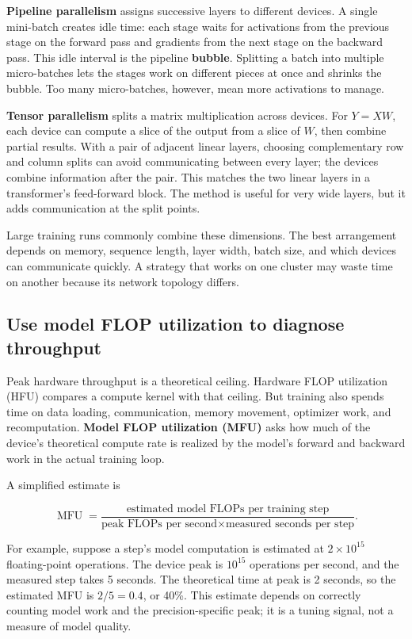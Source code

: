 \textbf{Pipeline parallelism} assigns successive layers to different devices. A single mini-batch creates idle time: each stage waits for activations from the previous stage on the forward pass and gradients from the next stage on the backward pass. This idle interval is the pipeline \textbf{bubble}. Splitting a batch into multiple micro-batches lets the stages work on different pieces at once and shrinks the bubble. Too many micro-batches, however, mean more activations to manage.

\textbf{Tensor parallelism} splits a matrix multiplication across devices. For \(Y=XW\), each device can compute a slice of the output from a slice of \(W\), then combine partial results. With a pair of adjacent linear layers, choosing complementary row and column splits can avoid communicating between every layer; the devices combine information after the pair. This matches the two linear layers in a transformer's feed-forward block. The method is useful for very wide layers, but it adds communication at the split points.

Large training runs commonly combine these dimensions. The best arrangement depends on memory, sequence length, layer width, batch size, and which devices can communicate quickly. A strategy that works on one cluster may waste time on another because its network topology differs.

\subsection{Use model FLOP utilization to diagnose throughput}\label{04-visual-computing-ii-ch031-use-model-flop-utilization-to-diagnose-throughput}

Peak hardware throughput is a theoretical ceiling. Hardware FLOP utilization (HFU) compares a compute kernel with that ceiling. But training also spends time on data loading, communication, memory movement, optimizer work, and recomputation. \textbf{Model FLOP utilization (MFU)} asks how much of the device's theoretical compute rate is realized by the model's forward and backward work in the actual training loop.

A simplified estimate is

\[
\operatorname{MFU}=\frac{\text{estimated model FLOPs per training step}}
{\text{peak FLOPs per second}\times\text{measured seconds per step}}.
\]

For example, suppose a step's model computation is estimated at \(2\times10^{15}\) floating-point operations. The device peak is \(10^{15}\) operations per second, and the measured step takes 5 seconds. The theoretical time at peak is 2 seconds, so the estimated MFU is \(2/5=0.4\), or 40\%. This estimate depends on correctly counting model work and the precision-specific peak; it is a tuning signal, not a measure of model quality.

